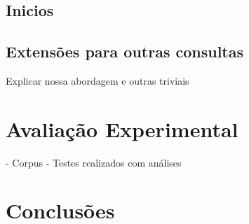\documentclass[12pt]{article}
\begin{document}
\subsection{Inicios}
\subsection{Extensões para outras consultas}
 Explicar nossa abordagem e outras triviais

\section{Avaliação Experimental}
- Corpus
- Testes realizados com análises

\section{Conclusões}




\end{document}
